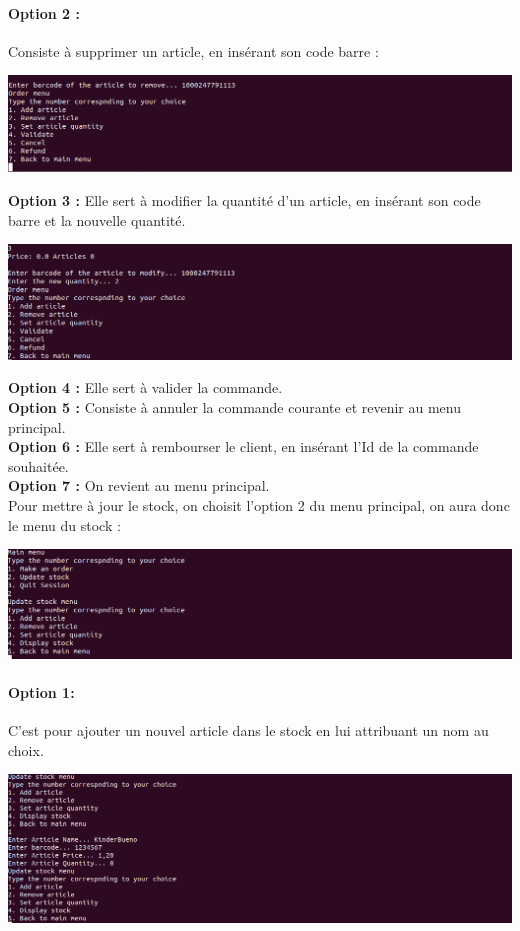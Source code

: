 \documentclass[french,10pt,a4paper]{report}
\begin{document}
\paragraph{\textbf{Option 2 :}} Consiste à supprimer un article, en insérant son code barre :
\begin{center}
	\includegraphics[scale=0.3]{captures/g_it3_9.png}
\end{center} 
\textbf{Option 3 :} Elle sert à modifier la quantité d’un article, en insérant son code barre et la nouvelle quantité.
\begin{center}
	\includegraphics[scale=0.3]{captures/g_it3_10.png}
\end{center} 
\textbf{Option 4 :}  Elle sert à valider la commande.\\
\textbf{Option 5 :}  Consiste à annuler la commande courante et revenir au menu principal.\\
\textbf{Option 6 :}   Elle sert à rembourser le client, en insérant l’Id de la commande souhaitée.\\
\textbf{Option 7 :}  On revient au menu principal.\\[1cm]
Pour mettre à jour le stock, on choisit l’option 2 du menu principal, on aura donc le menu du stock :
\begin{center}
	\includegraphics[scale=0.3]{captures/g_it3_11.png}
\end{center} 

\paragraph{\textbf{Option 1:}} C’est pour ajouter un nouvel article dans le stock en lui attribuant un nom au choix.
\begin{center}
	\includegraphics[scale=0.28]{captures/g_it3_12.png}
\end{center} 
\end{document}

